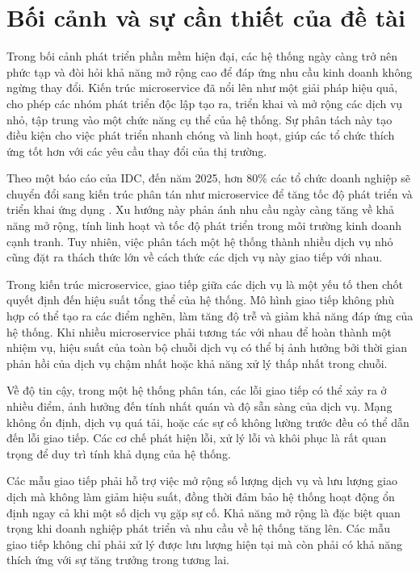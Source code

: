 \section{Bối cảnh và sự cần thiết của đề tài}
Trong bối cảnh phát triển phần mềm hiện đại, các hệ thống ngày càng trở nên
phức tạp và đòi hỏi khả năng mở rộng cao để đáp ứng nhu cầu kinh doanh không
ngừng thay đổi. Kiến trúc microservice đã nổi lên như một giải pháp hiệu quả,
cho phép các nhóm phát triển độc lập tạo ra, triển khai và mở rộng các dịch vụ
nhỏ, tập trung vào một chức năng cụ thể của hệ thống. Sự phân tách này tạo điều
kiện cho việc phát triển nhanh chóng và linh hoạt, giúp các tổ chức thích ứng
tốt hơn với các yêu cầu thay đổi của thị trường.

Theo một báo cáo của IDC, đến năm 2025, hơn 80\% các tổ chức doanh nghiệp sẽ
chuyển đổi sang kiến trúc phân tán như microservice để tăng tốc độ phát triển
và triển khai ứng dụng \cite{idc2021}. Xu hướng này phản ánh nhu cầu ngày càng tăng về khả
năng mở rộng, tính linh hoạt và tốc độ phát triển trong môi trường kinh doanh
cạnh tranh. Tuy nhiên, việc phân tách một hệ thống thành nhiều dịch vụ nhỏ cũng
đặt ra thách thức lớn về cách thức các dịch vụ này giao tiếp với nhau.

Trong kiến trúc microservice, giao tiếp giữa các dịch vụ là một yếu tố then
chốt quyết định đến hiệu suất tổng thể của hệ thống. Mô hình giao tiếp không
phù hợp có thể tạo ra các điểm nghẽn, làm tăng độ trễ và giảm khả năng đáp ứng
của hệ thống. Khi nhiều microservice phải tương tác với nhau để hoàn thành một
nhiệm vụ, hiệu suất của toàn bộ chuỗi dịch vụ có thể bị ảnh hưởng bởi thời gian
phản hồi của dịch vụ chậm nhất hoặc khả năng xử lý thấp nhất trong chuỗi.

Về độ tin cậy, trong một hệ thống phân tán, các lỗi giao tiếp có thể xảy ra ở
nhiều điểm, ảnh hưởng đến tính nhất quán và độ sẵn sàng của dịch vụ. Mạng không
ổn định, dịch vụ quá tải, hoặc các sự cố không lường trước đều có thể dẫn đến
lỗi giao tiếp. Các cơ chế phát hiện lỗi, xử lý lỗi và khôi phục là rất quan
trọng để duy trì tính khả dụng của hệ thống.

Các mẫu giao tiếp phải hỗ trợ việc mở rộng số lượng dịch vụ và lưu lượng giao
dịch mà không làm giảm hiệu suất, đồng thời đảm bảo hệ thống hoạt động ổn định
ngay cả khi một số dịch vụ gặp sự cố. Khả năng mở rộng là đặc biệt quan trọng
khi doanh nghiệp phát triển và nhu cầu về hệ thống tăng lên. Các mẫu giao tiếp
không chỉ phải xử lý được lưu lượng hiện tại mà còn phải có khả năng thích ứng
với sự tăng trưởng trong tương lai.

